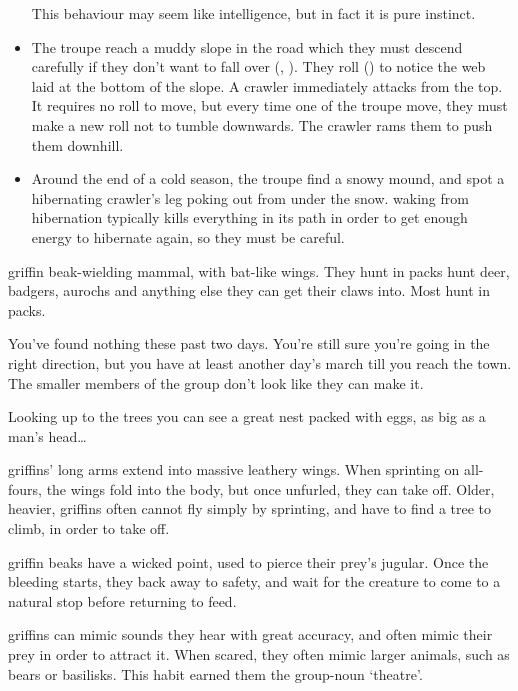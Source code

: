 \begin{multicols}{2}
\begin{itemize}
  This behaviour may seem like intelligence, but in fact it is pure instinct.
  \item
  The troupe reach a muddy slope in the road which they must descend carefully if they don't want to fall over (, \tn[7]).
  They roll  (\tn[8]) to notice the web laid at the bottom of the slope.
  A \gls{crawler} immediately attacks from the top.
  It requires no roll to move, but every time one of the troupe move, they must make a new roll not to tumble downwards.
  The \gls{crawler} rams them to push them downhill.
  \item
  Around the end of a cold season, the troupe find a snowy mound, and spot a hibernating \gls{crawler}'s leg poking out from under the snow.
   waking from hibernation typically kills everything in its path in order to get enough energy to hibernate again, so they must be careful.
\end{itemize}

  {griffin}%
  {beak-wielding mammal, with bat-like wings. They hunt in packs}%
hunt deer, badgers, aurochs and anything else they can get their claws into.
Most hunt in packs.

\begin{boxtext}
  You've found nothing these past two days.
  You're still sure you're going in the right direction, but you have at least another day's march till you reach the town.
  The smaller members of the group don't look like they can make it.

  Looking up to the trees you can see a great nest packed with eggs, as big as a man's head\ldots
\end{boxtext}

\Glspl{griffin}' long arms extend into massive leathery wings.
When sprinting on all-fours, the wings fold into the body, but once unfurled, they can take off.
Older, heavier, \glspl{griffin} often cannot fly simply by sprinting, and have to find a tree to climb, in order to take off.

\Gls{griffin} beaks have a wicked point, used to pierce their prey's jugular.
Once the bleeding starts, they back away to safety, and wait for the creature to come to a natural stop before returning to feed.

\Glspl{griffin} can mimic sounds they hear with great accuracy, and often mimic their prey in order to attract it.
When scared, they often mimic larger animals, such as bears or \glspl{basilisk}.
This habit earned them the group-noun `theatre'.


\end{multicols}
